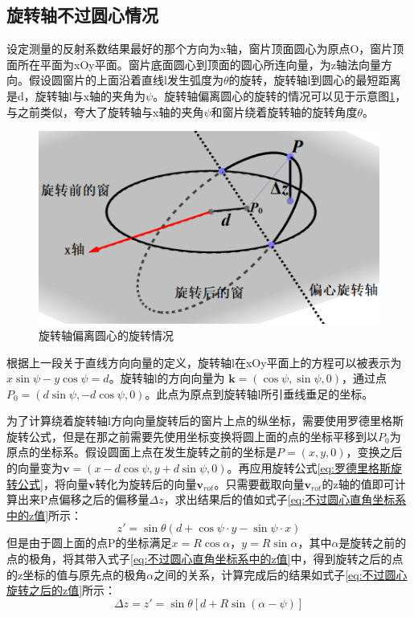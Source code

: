 \documentclass[master]{thesis-uestc}
\begin{document}
\subsection{旋转轴不过圆心情况}
设定测量的反射系数结果最好的那个方向为x轴，窗片顶面圆心为原点O，窗片顶面所在平面为xOy平面。窗片底面圆心到顶面的圆心所连向量，为z轴法向量方向。假设圆窗片的上面沿着直线l发生弧度为\(\theta\)的旋转，旋转轴l到圆心的最短距离是d，旋转轴l与x轴的夹角为\(\psi\)。旋转轴偏离圆心的旋转的情况可以见于示意图\ref{fig:旋转轴偏离圆心的旋转情况}，与之前类似，夸大了旋转轴与x轴的夹角\(\psi\)和窗片绕着旋转轴的旋转角度\(\theta\)。
\begin{figure}[!htb]
    \centering
    \includegraphics[width=0.45\linewidth]{pic/chapter5/不过圆心旋转示意图.png}
    \caption{旋转轴偏离圆心的旋转情况}
    \label{fig:旋转轴偏离圆心的旋转情况}
\end{figure}

根据上一段关于直线方向向量的定义，旋转轴l在xOy平面上的方程可以被表示为\(x \sin \psi - y \cos \psi = d\)。旋转轴l的方向向量为 \(\mathbf{k} = (\cos \psi, \sin \psi, 0)\)，通过点 \(P_0 = (d \sin\psi, -d\cos\psi , 0)\)。此点为原点到旋转轴l所引垂线垂足的坐标。

为了计算绕着旋转轴l方向向量旋转后的窗片上点的纵坐标，需要使用罗德里格斯旋转公式，但是在那之前需要先使用坐标变换将圆上面的点的坐标平移到以\(P_0\)为原点的坐标系。假设圆面上点在发生旋转之前的坐标是\(P = (x,y,0)\)，变换之后的向量变为\(\mathbf{v} = (x - d\cos\psi, y + d\sin\psi, 0)\)。再应用旋转公式\ref{eq:罗德里格斯旋转公式}，将向量\(\mathbf{v}\)转化为旋转后的向量\(\mathbf{v}_{rot}\)。只需要截取向量\(\mathbf{v}_{rot}\)的z轴的值即可计算出来P点偏移之后的偏移量\(\Delta z\)，求出结果后的值如式子\ref{eq:不过圆心直角坐标系中的z值}所示：
\begin{equation}\label{eq:不过圆心直角坐标系中的z值}
    z' = \sin \theta \left(d + \cos\psi \cdot y - \sin\psi \cdot x \right)
\end{equation}
但是由于圆上面的点P的坐标满足\(x = R\cos\alpha\)，\(y = R\sin\alpha\)，其中\(\alpha\)是旋转之前的点的极角，将其带入式子\ref{eq:不过圆心直角坐标系中的z值}中，得到旋转之后的点的z坐标的值与原先点的极角\(\alpha\)之间的关系，计算完成后的结果如式子\ref{eq:不过圆心旋转之后的z值}所示：
\begin{equation}\label{eq:不过圆心旋转之后的z值}
    \Delta z = z' = \sin \theta \left[d+R \sin (\alpha -\psi )\right]
\end{equation}
\end{document}
